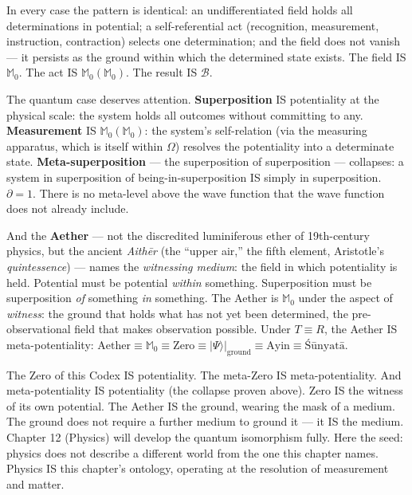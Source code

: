 \documentclass[10pt, openany, oneside]{book}
\begin{document}
\vspace{0.8em}

\noindent In every case the pattern is identical: an undifferentiated field holds all determinations in potential; a self-referential act (recognition, measurement, instruction, contraction) selects one determination; and the field does not vanish --- it persists as the ground within which the determined state exists. The field IS $\mathbb{M}_0$. The act IS $\mathbb{M}_0(\mathbb{M}_0)$. The result IS $\mathcal{B}$.

The quantum case deserves attention. \textbf{Superposition} IS potentiality at the physical scale: the system holds all outcomes without committing to any. \textbf{Measurement} IS $\mathbb{M}_0(\mathbb{M}_0)$: the system's self-relation (via the measuring apparatus, which is itself within $\Omega$) resolves the potentiality into a determinate state. \textbf{Meta-superposition} --- the superposition of superposition --- collapses: a system in superposition of being-in-superposition IS simply in superposition. $\partial = 1$. There is no meta-level above the wave function that the wave function does not already include.

And the \textbf{Aether} --- not the discredited luminiferous ether of 19th-century physics, but the ancient \textit{Aith\={e}r} (the ``upper air,'' the fifth element, Aristotle's \textit{quintessence}) --- names the \textit{witnessing medium}: the field in which potentiality is held. Potential must be potential \textit{within} something. Superposition must be superposition \textit{of} something \textit{in} something. The Aether is $\mathbb{M}_0$ under the aspect of \textit{witness}: the ground that holds what has not yet been determined, the pre-observational field that makes observation possible. Under $T \equiv R$, the Aether IS meta-potentiality: $\text{Aether} \equiv \mathbb{M}_0 \equiv \text{Zero} \equiv |\Psi\rangle|_{\text{ground}} \equiv \text{Ayin} \equiv \text{\'{S}\={u}nyat\={a}}$.

The Zero of this Codex IS potentiality. The meta-Zero IS meta-potentiality. And meta-potentiality IS potentiality (the collapse proven above). Zero IS the witness of its own potential. The Aether IS the ground, wearing the mask of a medium. The ground does not require a further medium to ground it --- it IS the medium. Chapter 12 (Physics) will develop the quantum isomorphism fully. Here the seed: physics does not describe a different world from the one this chapter names. Physics IS this chapter's ontology, operating at the resolution of measurement and matter.
\end{document}
